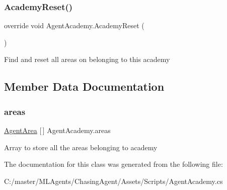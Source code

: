 \subsubsection{\texorpdfstring{AcademyReset()}{AcademyReset()}}
{\footnotesize\ttfamily override void Agent\+Academy.\+Academy\+Reset (\begin{DoxyParamCaption}{ }\end{DoxyParamCaption})}



Find and reset all areas on belonging to this academy 



\subsection{Member Data Documentation}
\mbox{\label{class_agent_academy_a52f0f105505b5a8185fdf89c75382a74}} 
\subsubsection{\texorpdfstring{areas}{areas}}
{\footnotesize\ttfamily \mbox{\hyperlink{class_agent_area}{Agent\+Area}} \mbox{[}$\,$\mbox{]} Agent\+Academy.\+areas\hspace{0.3cm}{\ttfamily [private]}}



Array to store all the areas belonging to academy 



The documentation for this class was generated from the following file\+:\begin{DoxyCompactItemize}
\item 
C\+:/master/\+M\+L\+Agents/\+Chasing\+Agent/\+Assets/\+Scripts/Agent\+Academy.\+cs\end{DoxyCompactItemize}
